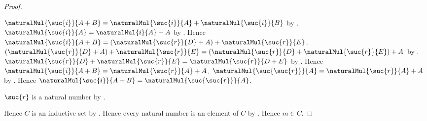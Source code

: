 \begin{proof}
\begin{subproof}
\begin{subproof}
\begin{byCase}
\begin{byCase}
                            $\naturalMul{\suc{i}}{A+B}
                                =\naturalMul{\suc{i}}{A}
                                    +\naturalMul{\suc{i}}{B}$ by
                                .
                            $\naturalMul{\suc{i}}{A}
                                =\naturalMul{i}{A}+A$ by
                                .
                            Hence $\naturalMul{\suc{i}}{A+B}
                                =(\naturalMul{\suc{r}}{D}+A)
                                    +\naturalMul{\suc{r}}{E}$.
                            $(\naturalMul{\suc{r}}{D}+A)
                                    +\naturalMul{\suc{r}}{E}
                                =(\naturalMul{\suc{r}}{D}
                                    +\naturalMul{\suc{r}}{E})+A$ by
                                .
                            $\naturalMul{\suc{r}}{D}
                                    +\naturalMul{\suc{r}}{E}
                                =\naturalMul{\suc{r}}{D+E}$ by
                                .
                            Hence $\naturalMul{\suc{i}}{A+B}
                                =\naturalMul{\suc{r}}{A}+A$.
                            $\naturalMul{\suc{\suc{r}}}{A}
                                =\naturalMul{\suc{r}}{A}+A$ by
                                .
                            Hence $\naturalMul{\suc{i}}{A+B}
                                =\naturalMul{\suc{\suc{r}}}{A}$.
                    \end{byCase}
            \end{byCase}
        \end{subproof}
        $\suc{r}$ is a natural number by .
    \end{subproof}
    Hence $C$ is an inductive set by .
    Hence every natural number is an element of $C$ by
        .
    Hence $m\in C$.
\end{proof}

